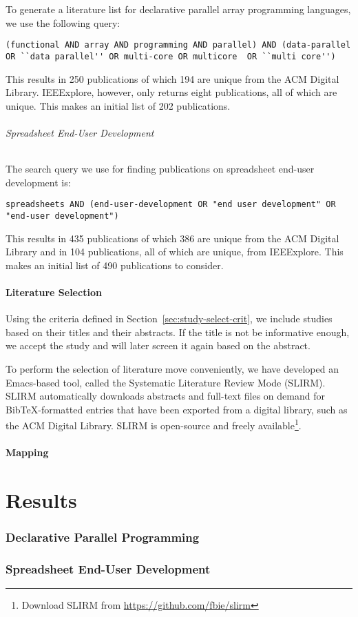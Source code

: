 \documentclass[a4paper]{article}
\begin{document}
To generate a literature list for declarative parallel array
programming languages, we use the following query:

\begin{lstlisting}
(functional AND array AND programming AND parallel) AND (data-parallel OR ``data parallel'' OR multi-core OR multicore  OR ``multi core'')
\end{lstlisting}

This results in 250 publications of which 194 are unique from the ACM
Digital Library. IEEExplore, however, only returns eight publications,
all of which are unique. This makes an initial list of 202
publications.

\paragraph{Spreadsheet End-User Development}

The search query we use for finding publications on spreadsheet
end-user development is:

\begin{lstlisting}
spreadsheets AND (end-user-development OR "end user development" OR "end-user development")
\end{lstlisting}

This results in 435 publications of which 386 are unique from the ACM
Digital Library and in 104 publications, all of which are unique, from
IEEExplore. This makes an initial list of 490 publications to
consider.

\subsection{Literature Selection}
\label{sec:literature-selection}

Using the criteria defined in Section~\ref{sec:study-select-crit}, we
include studies based on their titles and their abstracts. If the
title is not be informative enough, we accept the study and will later
screen it again based on the abstract.

To perform the selection of literature move conveniently, we have
developed an Emacs-based tool, called the Systematic Literature Review
Mode (SLIRM). SLIRM automatically downloads abstracts and full-text
files on demand for BibTeX-formatted entries that have been exported
from a digital library, such as the ACM Digital Library. SLIRM is
open-source and freely available\footnote{Download SLIRM from
  \url{https://github.com/fbie/slirm}}.

\subsection{Mapping}
\label{sec:mapping}

\newpage{}
\part{Results}
\label{part:results}

\section{Declarative Parallel Programming}
\label{sec:declarative-parallel-programming}

\section{Spreadsheet End-User Development}
\label{sec:spreadsheet-end-user-dev}
\end{document}
